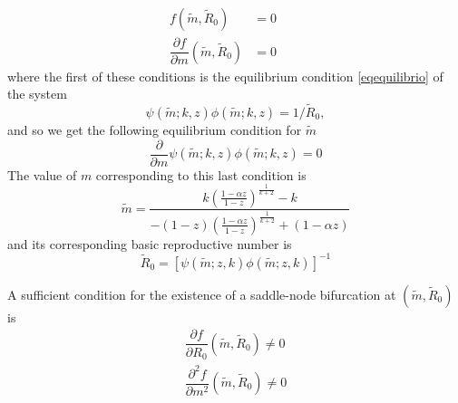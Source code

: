 \documentclass[12pt,a4paper]{article}
\theoremstyle{plain}%
\theoremstyle{definition}
\theoremstyle{remark}
\begin{document}
\begin{equation}
\begin{split}
f(\tilde m,\tilde R_0)&=0\qquad\\
\dfrac{\partial f}{\partial m}(\tilde m,\tilde R_0)&=0
\end{split}
\end{equation}
where the first of these conditions is the equilibrium condition \eqref{eqequilibrio} of the system
\begin{equation*}
\psi(\tilde m;k,z)\phi(\tilde m;k,z)=1/\tilde R_0,
\end{equation*}
and so we get the following equilibrium condition for $\tilde m$
\begin{equation}
\frac{\partial }{\partial m}\psi(\tilde m;k,z)\phi(\tilde m;k,z)=0	
\end{equation}
The value of $m$ corresponding to this last condition is
\begin{equation}
\tilde m=\dfrac{k\left( \frac{1-\alpha z}{1-z}\right)^{\frac{1}{k+2}} - k}{-(1-z)\left( \frac{1-\alpha z}{1-z}\right)^{\frac{1}{k+2}} + (1-\alpha z)}	
\end{equation}
and its corresponding basic reproductive number is
\begin{equation}
\tilde R_0=\left[ \psi(\tilde m;z,k)\phi(\tilde m;z,k)\right]^{-1}
\end{equation}	
 
A sufficient condition for the existence of a saddle-node bifurcation at $(\tilde m,\tilde R_0)$ is
\begin{equation}
\begin{split}
\dfrac{\partial f }{\partial R_0}(\tilde m,\tilde R_0)\neq0\\
\dfrac{\partial^2 f }{\partial m^2}(\tilde m,\tilde R_0)\neq0
\end{split}
\end{equation}
\end{document}
